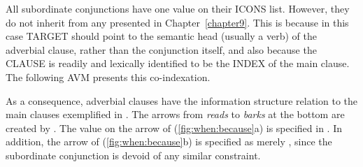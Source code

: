 

All subordinate conjunctions have one  value on their
ICONS list. However, they do not inherit from any 
presented in Chapter~\ref{chapter9}. This is
because in this case TARGET should point to the semantic head (usually
a verb) of the adverbial clause, rather than the conjunction itself,
and also because the CLAUSE is readily and lexically identified to be
the INDEX of the main clause.  The following AVM presents this
co-indexation.




\noindent As a consequence, adverbial clauses have the information
structure relation to the main clauses exemplified in
. The arrows from \textit{reads} to
\textit{barks} at the bottom are created by .
The value  on the arrow of (\ref{fig:when:because}a) is
specified in . In addition, the arrow of
(\ref{fig:when:because}b) is specified as merely , since
the subordinate conjunction is devoid of any similar constraint.







